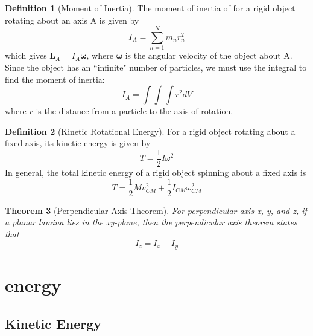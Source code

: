 \documentclass[12pt]{article}
\newtheorem{thm}{Theorem}[section]
\theoremstyle{definition}
\newtheorem{defn}[thm]{Definition}
\theoremstyle{remark}
\numberwithin{equation}{section}
\newcommand\B[1]{\textbf{#1}}
\begin{document}
\begin{defn}[Moment of Inertia]
        The moment of inertia of for a rigid object rotating about an axis A is given by \begin{equation}
                I_A = \sum\limits_{n=1}^Nm_nr_n^2
        \end{equation}
        which gives $\B{L}_A = I_A\boldsymbol{\omega}$, where $\boldsymbol{\omega}$ is the angular velocity of the object about A. Since the object has an ``infinite" number of particles, we must use the integral to find the moment of inertia:\begin{equation}
                I_A = \int\int\int r^2 dV
        \end{equation}
        where $r$ is the distance from a particle to the axis of rotation.
\end{defn}

\vspace{15pt}

\begin{defn}[Kinetic Rotational Energy]
        For a rigid object rotating about a fixed axis, its kinetic energy is given by \begin{equation}
                T = \frac{1}{2}I\omega^2
        \end{equation}
        In general, the total kinetic energy of a rigid object spinning about a fixed axis is \begin{equation}
                T = \frac{1}{2}Mv_{CM}^2 + \frac{1}{2}I_{CM}\omega_{CM}^2
        \end{equation}
\end{defn}
\vspace{15pt}


\begin{thm}[Perpendicular Axis Theorem]
        For perpendicular axis x, y, and z, if a planar lamina lies in the xy-plane, then the perpendicular axis theorem states that \begin{equation}
                I_z = I_x + I_y
        \end{equation}
\end{thm}


\vspace{15pt}

\section{energy}

\subsection{Kinetic Energy}
\end{document}
